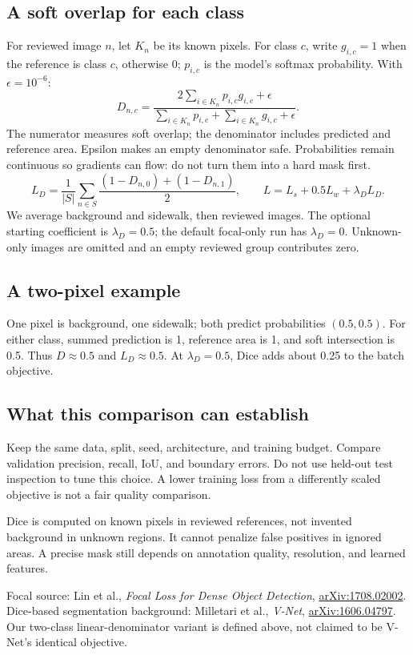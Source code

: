 \documentclass[11pt,letterpaper]{article}
\newcommand{\note}[1]{\par\vspace{3pt}\begingroup\setlength{\fboxsep}{8pt}%
 \colorbox{pale}{\parbox{\dimexpr\linewidth-2\fboxsep\relax}{#1}}\endgroup\par\vspace{3pt}}
\begin{document}
\subsection*{A soft overlap for each class}
For reviewed image $n$, let $K_n$ be its known pixels. For class $c$, write $g_{i,c}=1$ when the reference is class $c$, otherwise 0; $p_{i,c}$ is the model's softmax probability. With $\epsilon=10^{-6}$:
\[
D_{n,c}=\frac{2\sum_{i\in K_n}p_{i,c}g_{i,c}+\epsilon}
{\sum_{i\in K_n}p_{i,c}+\sum_{i\in K_n}g_{i,c}+\epsilon}.
\]
The numerator measures soft overlap; the denominator includes predicted and reference area. Epsilon makes an empty denominator safe. Probabilities remain continuous so gradients can flow: do not turn them into a hard mask first.
\[
L_D=\frac{1}{|S|}\sum_{n\in S}\frac{(1-D_{n,0})+(1-D_{n,1})}{2},
\qquad L=L_s+0.5L_w+\lambda_D L_D.
\]
We average background and sidewalk, then reviewed images. The optional starting coefficient is $\lambda_D=0.5$; the default focal-only run has $\lambda_D=0$. Unknown-only images are omitted and an empty reviewed group contributes zero.

\subsection*{A two-pixel example}
One pixel is background, one sidewalk; both predict probabilities $(0.5,0.5)$. For either class, summed prediction is 1, reference area is 1, and soft intersection is 0.5. Thus $D\approx0.5$ and $L_D\approx0.5$. At $\lambda_D=0.5$, Dice adds about 0.25 to the batch objective.

\subsection*{What this comparison can establish}
Keep the same data, split, seed, architecture, and training budget. Compare validation precision, recall, IoU, and boundary errors. Do not use held-out test inspection to tune this choice. A lower training loss from a differently scaled objective is not a fair quality comparison.

\note{Dice is computed on known pixels in reviewed references, not invented background in unknown regions. It cannot penalize false positives in ignored areas. A precise mask still depends on annotation quality, resolution, and learned features.}

{\small Focal source: Lin et al., \emph{Focal Loss for Dense Object Detection}, \href{https://arxiv.org/abs/1708.02002}{arXiv:1708.02002}. Dice-based segmentation background: Milletari et al., \emph{V-Net}, \href{https://arxiv.org/abs/1606.04797}{arXiv:1606.04797}. Our two-class linear-denominator variant is defined above, not claimed to be V-Net's identical objective.}
\end{document}
